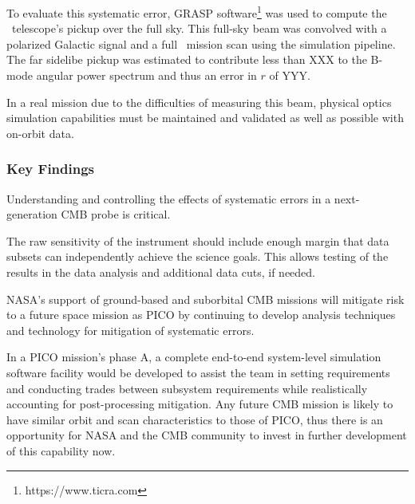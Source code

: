 \documentclass[PICOReport.tex]{subfiles}
\begin{document}
To evaluate this systematic error, GRASP software\footnote{https://www.ticra.com} was used to compute the \pico\ telescope's pickup over the full sky.  This full-sky beam was convolved with a polarized Galactic signal and a full \pico\ mission scan using the simulation pipeline.  The far sidelibe pickup was estimated to contribute less than XXX to the B-mode angular power spectrum and thus an error in $r$ of YYY.

In a real mission due to the difficulties of measuring this beam, physical optics simulation capabilities must be maintained and validated as well as possible with on-orbit data.

\subsubsection{Key Findings}
Understanding and controlling the effects of systematic errors in a
next-generation CMB probe is critical.

The raw sensitivity of the instrument should include enough margin
that data subsets can independently achieve the science goals.
This allows testing of the results in the data analysis and additional
data cuts, if needed.

NASA's support of ground-based and suborbital CMB missions will mitigate risk to a future space mission as PICO by continuing to develop analysis techniques and technology for mitigation of systematic errors.

In a PICO mission's phase A, a complete end-to-end system-level
simulation software facility would be developed to assist the team in setting 
requirements and conducting trades between subsystem requirements while
realistically accounting for post-processing mitigation.  Any future
CMB mission is likely to have similar orbit  
and scan characteristics to those of PICO, thus there is an opportunity for NASA and
the CMB community to invest in further development of this capability now.
\end{document}
